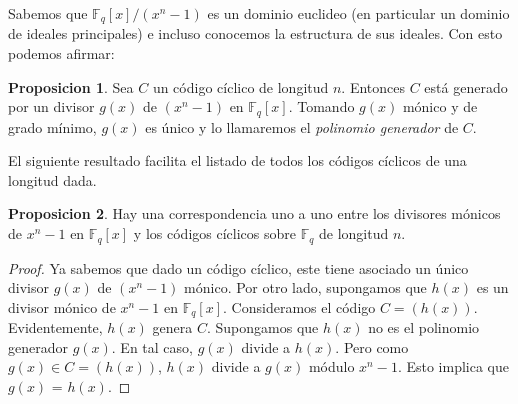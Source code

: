 \documentclass[a4paper,11pt]{article}
\numberwithin{equation}{section}
\theoremstyle{definition} %
\newtheorem{proposicion}{Proposicion}[section]
\newcommand{\Fq}{\mathbb{F}_q}
\newcommand{\Fqx}{\Fq[x]}
\newcommand{\Fx}{\Fq[x]/(x^n - 1)}
\begin{document}
    Sabemos que $\Fx$ es un dominio euclideo (en particular un dominio de ideales principales) e incluso conocemos la estructura de sus ideales. Con esto podemos afirmar:

    \begin{proposicion}
        Sea $C$ un código cíclico de longitud $n$. Entonces $C$ está generado por un divisor  $g(x)$ de $(x^n - 1)$ en $\Fqx$. Tomando $g(x)$ mónico y de grado mínimo, $g(x)$ es único y lo llamaremos el \emph{polinomio generador} de $C$.
    \end{proposicion}

    El siguiente resultado facilita el listado de todos los códigos cíclicos de una longitud dada.

    \begin{proposicion}
        Hay una correspondencia uno a uno entre los divisores mónicos de $x^n - 1$ en $\Fqx$ y los códigos cíclicos sobre $\Fq$ de longitud $n$.
    \end{proposicion}
    \begin{proof}
        Ya sabemos que dado un código cíclico, este tiene asociado un único divisor $g(x)$ de $(x^n - 1)$ mónico.
        Por otro lado, supongamos que $h(x)$ es un divisor mónico de $x^n - 1$ en $\Fqx$. Consideramos el código $C = (h(x))$. Evidentemente, $h(x)$ genera $C$. Supongamos que $h(x)$ no es el polinomio generador $g(x)$. En tal caso, $g(x)$ divide a $h(x)$. Pero como $g(x) \in C = (h(x))$, $h(x)$ divide a $g(x)$ módulo $x^n - 1$. Esto implica que $g(x)$ = $h(x)$.
    \end{proof}
\end{document}
